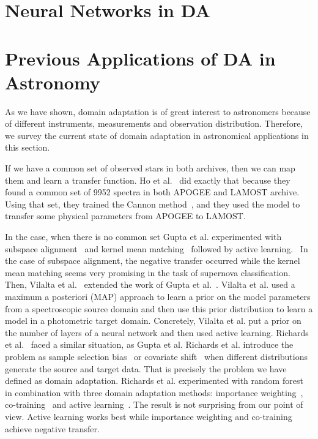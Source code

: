 \documentclass[thesis=M,english]{FITthesis}[2012/10/20]
\begin{document}
\section{Neural Networks in DA}

\section{Previous Applications of DA in Astronomy}

As we have shown, domain adaptation is of great interest to astronomers
because of different instruments, measurements and observation distribution.
Therefore, we survey the current state of domain adaptation in astronomical applications in this section.

If we have a common set of observed stars in both archives,
then we can map them and learn a transfer function.
Ho et al.~\cite{ho2017} did exactly that
because they found a common set of 9952 spectra in both APOGEE and LAMOST archive.
Using that set, they trained the Cannon method~\cite{ness2015},
and they used the model to transfer some physical parameters from APOGEE to LAMOST.

In the case, when there is no common set Gupta et al. experimented with subspace alignment~\cite{fernando2014} and kernel mean matching~\cite{gretton2009} followed by active learning.~\cite{gupta2016}
In the case of subspace alignment, the negative transfer occurred while the kernel mean matching seems very promising in the task of supernova classification.
Then, Vilalta et al.~\cite{vilalta2018} extended the work of Gupta et al.~\cite{gupta2016}.
Vilalta et al. used a maximum a posteriori (MAP) approach to learn a prior on the model parameters from a spectroscopic source domain
and then use this prior distribution to learn a model in a photometric target domain.
Concretely, Vilalta et al. put a prior on the number of layers of a neural network
and then used active learning.
Richards et al.~\cite{richards2011} faced a similar situation, as Gupta et al.
Richards et al. introduce the problem as sample selection bias~\cite{shimodaira2000} or covariate shift~\cite{heckman1979}
when different distributions generate the source and target data.
That is precisely the problem we have defined as domain adaptation.
Richards et al. experimented with random forest in combination with three domain adaptation methods:
importance weighting~\cite{shimodaira2000}, co-training~\cite{blum1998} and active learning~\cite{settles2009}.
The result is not surprising from our point of view.
Active learning works best while importance weighting and co-training achieve negative transfer.
\end{document}
